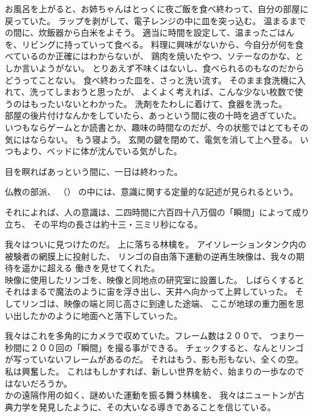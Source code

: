 \documentclass[../IHMain]{subfiles}
\begin{document}
お風呂を上がると、お姉ちゃんはとっくに夜ご飯を食べ終わって、自分の部屋に戻っていた。
ラップを剥がして、電子レンジの中に皿を突っ込む。
温まるまでの間に、炊飯器から白米をよそう。
適当に時間を設定して、温まったごはんを、リビングに持っていって食べる。
料理に興味がないから、今自分が何を食べているのか正確にはわからないが、
鶏肉を焼いたやつ、ソテーなのかな、としか言いようがない。
とりあえず不味くはないし、食べられるのもなのだからどうってことない。
食べ終わった皿を、さっと洗い流す。
そのまま食洗機に入れて、洗ってしまおうと思ったが、
よくよく考えれば、こんな少ない枚数で使うのはもったいないとわかった。
洗剤をたわしに着けて、食器を洗った。\\

部屋の後片付けなんかをしていたら、あっという間に夜の十時を過ぎていた。
いつもならゲームとか読書とか、趣味の時間なのだが、今の状態ではとてもその気にはならない。
もう寝よう。
玄関の鍵を閉めて、電気を消して上へ登る。
いつもより、ベッドに体が沈んでいる気がした。

目を瞑ればあっという間に、一日は終わった。

\newpage
{\onecolumn
\markboth{}{}
\begin{center}
\end{center}

仏教の部派、
（）
の中には、意識に関する定量的な記述が見られるという。

それによれば、人の意識は、二四時間に六百四十八万個の「瞬間」によって成り立ち、
その平均の長さは約十三・三ミリ秒になる。
\begin{center}
\end{center}}

我々はついに見つけたのだ。
上に落ちる林檎を。
アイソレーションタンク内の被験者の網膜上に投射した、
リンゴの自由落下運動の逆再生映像は、我々の期待を遥かに超える
働きを見せてくれた。\\

映像に使用したリンゴを、映像と同地点の研究室に設置した。
しばらくするとそれはまるで魔法のように宙を浮き出し、天井へ向かって上昇していった。
そしてリンゴは、映像の端と同じ高さに到達した途端、
ここが地球の重力圏を思い出したかのように地面へと落下していった。

我々はこれを多角的にカメラで収めていた。フレーム数は２００で、
つまり一秒間に２００回の「瞬間」を撮る事ができる。
チェックすると、なんとリンゴが写っていないフレームがあるのだ。
それはもう、影も形もない、全くの空。
私は興奮した。
これはもしかすれば、新しい世界を紡ぐ、始まりの一歩なのではないだろうか。\\

かの遠隔作用の如く、謎めいた運動を振る舞う林檎を、
我々はニュートンが古典力学を発見したように、その大いなる導きであることを信じている。
\end{document}
